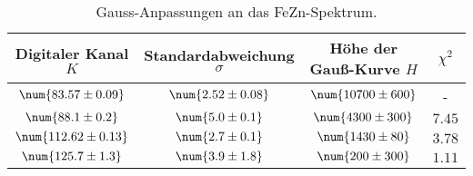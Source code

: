 \begin{table}[htbp]
   \centering
\caption{Gauss-Anpassungen an das FeZn-Spektrum.}
\begin{tabular}{c c c c}
\hline Digitaler Kanal $K$ & Standardabweichung $\sigma$ & Höhe der Gauß-Kurve $H$ & $\chi^2$ \\ 
\hline
$\num{83.57\pm 0.09}$ & $\num{2.52\pm 0.08}$ & $\num{10700\pm 600}$ & - \\
$\num{88.1\pm 0.2}$ & $\num{5.0\pm 0.1}$ & $\num{4300\pm 300}$ & $\num{7.45}$ \\
$\num{112.62\pm 0.13}$ & $\num{2.7\pm 0.1}$ & $\num{1430\pm 80}$ & $\num{3.78}$ \\
$\num{125.7\pm 1.3}$ & $\num{3.9\pm 1.8}$ & $\num{200\pm 300}$ & $\num{1.11}$ \\
\hline\end{tabular}
\label{tab:fezn-gauss-fits}
\end{table}